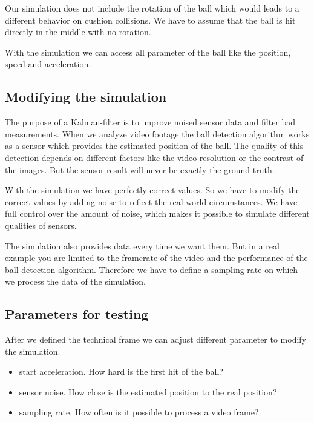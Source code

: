 \documentclass[titlepage, a4paper, 11pt]{scrartcl}
\begin{document}
        Our simulation does not include the rotation of the ball which would leads to a different behavior on cushion collisions.
        We have to assume that the ball is hit directly in the middle with no rotation.

        With the simulation we can access all parameter of the ball like the position, speed and acceleration.

        \subsection{Modifying the simulation}

        The purpose of a Kalman-filter is to improve noised sensor data and filter bad measurements.
        When we analyze video footage the ball detection algorithm works as a sensor which provides the estimated position of the ball.
        The quality of this detection depends on different factors like the video resolution or the contrast of the images.
        But the sensor result will never be exactly the ground truth.

        With the simulation we have perfectly correct values. So we have to modify the correct values by adding noise to reflect the real world circumstances.
        We have full control over the amount of noise, which makes it possible to simulate different qualities of sensors.

        The simulation also provides data every time we want them. But in a real example you are limited to the framerate of the video and the performance of the ball detection algorithm.
        Therefore we have to define a sampling rate on which we process the data of the simulation. 

        \subsection{Parameters for testing}

        After we defined the technical frame we can adjust different parameter to modify the simulation.

        \begin{itemize}
            \item start acceleration. How hard is the first hit of the ball?
            \item sensor noise. How close is the estimated position to the real position?
            \item sampling rate. How often is it possible to process a video frame?
        \end{itemize}
\end{document}
